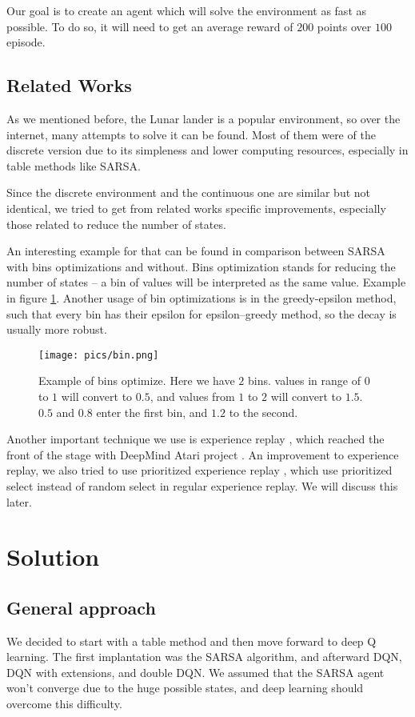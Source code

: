 \documentclass{article}
\begin{document}
	Our goal is to create an agent which will solve the environment as fast as possible. To do so, it will need to get an average reward of $ 200 $ points over $ 100 $ episode.
	
	\subsection{Related Works}
	As we mentioned before, the Lunar lander is a popular environment, so over the internet, many attempts to solve it can be found. Most of them were of the discrete version due to its simpleness and lower computing resources, especially in table methods like SARSA.
	
	Since the discrete environment and the continuous one are similar but not identical, we tried to get from related works specific improvements, especially those related to reduce the number of states.
	
	An interesting example for that can be found in comparison \cite{gadgil2020solving} between SARSA with bins optimizations and without. Bins optimization stands for reducing the number of states -- a bin of values will be interpreted as the same value. Example in figure \ref{bin}.
	Another usage of bin optimizations is in the greedy-epsilon method, such that every bin has their epsilon for epsilon--greedy method, so the decay is usually more robust. 
	\begin{figure}[h!]
		\begin{center}
			\texttt{[image: pics/bin.png]}
		\end{center}
		\captionsetup{width=\textwidth/2}
		\caption{Example of bins optimize. Here we have $ 2 $ bins. values in range of $ 0 $ to $ 1 $ will convert to $ 0.5 $, and values from $ 1 $ to $ 2 $ will convert to $ 1.5 $. $ 0.5 $ and $ 0.8 $ enter the first bin, and $ 1.2 $ to the second.}
		\label{bin}
	\end{figure}
	Another important technique we use is experience replay \cite{lin1993reinforcement}, which reached the front of the stage with DeepMind Atari project \cite{mnih2013playing}. An improvement to experience replay, we also tried to use prioritized experience replay \cite{schaul2015prioritized}, which use prioritized select instead of random select in regular experience replay. We will discuss this later.
	\section{Solution}
	\subsection{General approach}
	We decided to start with a table method and then move forward to deep Q learning.
	The first implantation was the SARSA algorithm, and afterward DQN, DQN with extensions, and double DQN. 
	We assumed that the SARSA agent won't converge due to the huge possible states, and deep learning should overcome this difficulty.
	
\end{document}
